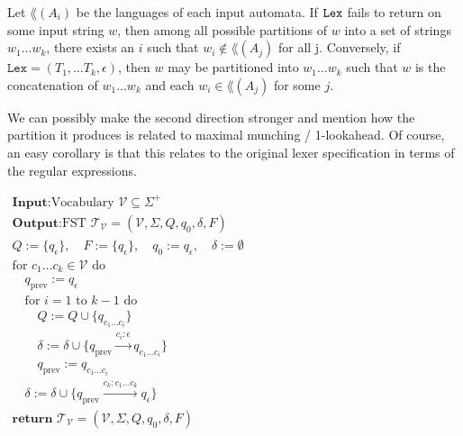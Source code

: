 \begin{theorem}
    \label{thm:LexSplit}
    Let $\lang(A_i)$ be the languages of each input automata.
    If $\mathtt{Lex}$ fails to return on some input string $w$, then among all possible partitions of $w$ into a set of strings $w_1 \ldots w_k$, there exists an $i$ such that $w_i \notin \lang(A_j)$ for all j. Conversely, if $\texttt{Lex} = (T_1, \ldots T_k, \epsilon)$, then $w$ may be partitioned into $w_1 \ldots w_k$ such that $w$ is the concatenation of $w_1 \ldots w_k$ and each $w_i \in \lang(A_j)$ for some $j$.
\end{theorem}
We can possibly make the second direction stronger and mention how the partition it produces is related to maximal munching / 1-lookahead. Of course, an easy corollary is that this relates to the original lexer specification in terms of the regular expressions.

\begin{definition}[DetokenizingFST]
    \label{def:DetokenizingFST}
    $
    \begin{array}{l}
        \textbf{Input:} \text{Vocabulary } \mathcal{V} \subseteq \Sigma^+ \\
        \textbf{Output:} \text{FST } \mathcal{T}_\mathcal{V} = (\mathcal{V}, \Sigma, Q, q_0, \delta, F) \\
        Q := \{q_\epsilon\},\quad F := \{q_\epsilon\},\quad q_0 := q_\epsilon,\quad \delta := \emptyset \\
        \text{for } c_1 \ldots c_k \in \mathcal{V} \text{ do} \\
        \quad q_{\text{prev}} := q_\epsilon \\
        \quad \text{for } i = 1 \text{ to } k-1 \text{ do} \\
        \quad\quad Q := Q \cup \{q_{c_1 \ldots c_i}\} \\
        \quad\quad \delta := \delta \cup \{ q_{\text{prev}} \xrightarrow{c_i:\epsilon} q_{c_1 \ldots c_i} \} \\
        \quad\quad q_{\text{prev}} := q_{c_1 \ldots c_i} \\
        \quad \delta := \delta \cup \{ q_{\text{prev}} \xrightarrow{c_k:c_1\ldots c_k} q_\epsilon \} \\
        \textbf{return } \mathcal{T}_\mathcal{V} = (\mathcal{V}, \Sigma, Q, q_0, \delta, F)
    \end{array}
    $
\end{definition}

